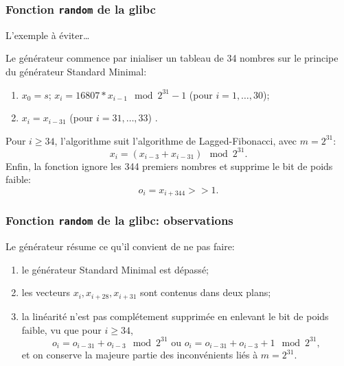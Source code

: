 \documentclass[t,usepdftitle=false]{beamer}
\begin{document}
\begin{frame}
\frametitle{Fonction \texttt{random} de la
glibc}


L'exemple à éviter\ldots

\mbox{}

Le générateur commence par inialiser un tableau de 34 nombres sur le
principe du générateur Standard Minimal:
\begin{enumerate}
\item
$x_0 = s$; $x_i = 16807*x_{i-1}\mod 2^{31}-1$ (pour $i = 1,\ldots,30$);
\item
$x_i = x_{i-31}$ (pour $i = 31,\ldots,33$) .
\end{enumerate}

\mbox{}

Pour $i \geq 34$, l'algorithme suit l'algorithme de Lagged-Fibonacci,
avec $m = 2^{31}$:
\[
x_i = (x_{i-3} + x_{i-31}) \mod 2^{31}.
\]
Enfin, la fonction ignore les 344 premiers nombres et supprime le bit
de poids faible:
\[
o_i = x_{i+344} >> 1.
\]
\end{frame}

\begin{frame}
\frametitle{Fonction \texttt{random} de la glibc: observations}

Le générateur résume ce qu'il convient de ne pas faire:
\begin{enumerate}
\item
le générateur Standard Minimal est dépassé;
\item
les vecteurs $x_i, x_{i+28}, x_{i+31}$ sont contenus dans deux plans;
\item
la linéarité n'est pas complétement supprimée en enlevant le bit de
poids faible, vu que pour $i \geq 34$,
\[
o_i = o_{i-31} + o_{i-3} \mod 2^{31} \mbox{ ou } o_i = o_{i-31} +
o_{i-3} + 1 \mod 2^{31},
\]
et on conserve la majeure partie des inconvénients liés
à $m = 2^{31}$.
\end{enumerate}

\end{frame}
\end{document}
